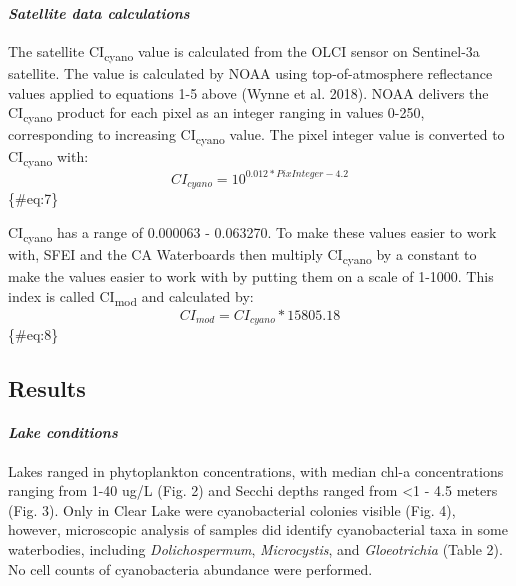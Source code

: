 \documentclass[]{article}
\let\oldparagraph\paragraph
\renewcommand{\paragraph}[1]{\oldparagraph{#1}\mbox{}}
\begin{document}
\paragraph{\texorpdfstring{\emph{Satellite data
calculations}}{Satellite data calculations}}\label{satellite-data-calculations}

The satellite CI\textsubscript{cyano} value is calculated from the OLCI
sensor on Sentinel-3a satellite. The value is calculated by NOAA using
top-of-atmosphere reflectance values applied to equations 1-5 above
(Wynne et al. 2018). NOAA delivers the CI\textsubscript{cyano} product
for each pixel as an integer ranging in values 0-250, corresponding to
increasing CI\textsubscript{cyano} value. The pixel integer value is
converted to CI\textsubscript{cyano} with: \[
\begin{equation}
CI_{cyano} = 10^{0.012 * PixInteger - 4.2}
\end{equation}
\] \{\#eq:7\}

CI\textsubscript{cyano} has a range of 0.000063 - 0.063270. To make
these values easier to work with, SFEI and the CA Waterboards then
multiply CI\textsubscript{cyano} by a constant to make the values easier
to work with by putting them on a scale of 1-1000. This index is called
CI\textsubscript{mod} and calculated by: \[
\begin{equation}
CI_{mod} = CI_{cyano} * 15805.18
\end{equation}
\] \{\#eq:8\}

\subsection{\texorpdfstring{\textbf{Results}}{Results}}\label{results}

\paragraph{\texorpdfstring{\emph{Lake
conditions}}{Lake conditions}}\label{lake-conditions}

Lakes ranged in phytoplankton concentrations, with median chl-a
concentrations ranging from 1-40 ug/L (Fig. 2) and Secchi depths ranged
from \textless{}1 - 4.5 meters (Fig. 3). Only in Clear Lake were
cyanobacterial colonies visible (Fig. 4), however, microscopic analysis
of samples did identify cyanobacterial taxa in some waterbodies,
including \emph{Dolichospermum}, \emph{Microcystis}, and
\emph{Gloeotrichia} (Table 2). No cell counts of cyanobacteria abundance
were performed.
\end{document}
